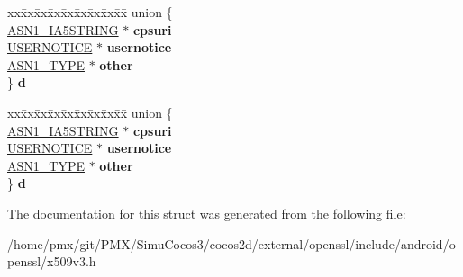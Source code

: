 \begin{DoxyCompactItemize}
\begin{tabbing}
\end{tabbing}\item 
\mbox{\label{structPOLICYQUALINFO__st_a78114f5adfc6f8759792786325285116}} 
\begin{tabbing}
xx\=xx\=xx\=xx\=xx\=xx\=xx\=xx\=xx\=\kill
union \{\\
\>\hyperlink{structasn1__string__st}{ASN1\_IA5STRING} $\ast$ {\bfseries cpsuri}\\
\>\hyperlink{structUSERNOTICE__st}{USERNOTICE} $\ast$ {\bfseries usernotice}\\
\>\hyperlink{structasn1__type__st}{ASN1\_TYPE} $\ast$ {\bfseries other}\\
\} {\bfseries d}\\

\end{tabbing}\item 
\mbox{\label{structPOLICYQUALINFO__st_a3b2e430c74fafcb853ec3b087be4d65a}} 
\begin{tabbing}
xx\=xx\=xx\=xx\=xx\=xx\=xx\=xx\=xx\=\kill
union \{\\
\>\hyperlink{structasn1__string__st}{ASN1\_IA5STRING} $\ast$ {\bfseries cpsuri}\\
\>\hyperlink{structUSERNOTICE__st}{USERNOTICE} $\ast$ {\bfseries usernotice}\\
\>\hyperlink{structasn1__type__st}{ASN1\_TYPE} $\ast$ {\bfseries other}\\
\} {\bfseries d}\\

\end{tabbing}\end{DoxyCompactItemize}


The documentation for this struct was generated from the following file\+:\begin{DoxyCompactItemize}
\item 
/home/pmx/git/\+P\+M\+X/\+Simu\+Cocos3/cocos2d/external/openssl/include/android/openssl/x509v3.\+h\end{DoxyCompactItemize}
